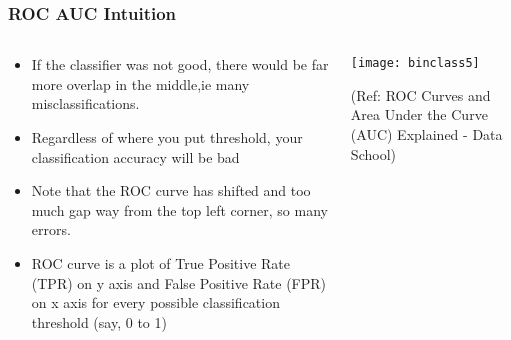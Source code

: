 \begin{frame}[fragile]\frametitle{ROC AUC Intuition}

\begin{columns}
\begin{column}[T]{0.5\linewidth}
\begin{itemize}
\item If the classifier was not good, there would be far more overlap in the middle,ie many misclassifications.
\item Regardless of where you put threshold, your classification accuracy will be bad
\item Note that the ROC curve has shifted and too much gap way from the top left corner, so many errors.
\item ROC curve is a plot of True Positive Rate (TPR) on y axis and False Positive Rate (FPR) on x axis for every possible classification threshold (say, 0 to 1)
\end{itemize}
\end{column}
\begin{column}[T]{0.5\linewidth}

\begin{center}
\texttt{[image: binclass5]}
\end{center}

\tiny{(Ref: ROC Curves and Area Under the Curve (AUC) Explained - Data School)}
\end{column}

\end{columns}
\end{frame}


